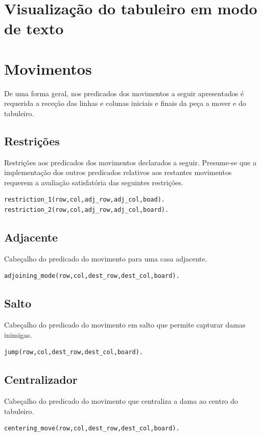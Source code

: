 \documentclass[a4paper,11pt]{article}
\begin{document}
\section{Visualização do tabuleiro em modo de texto}

\section{Movimentos}

De uma forma geral, nos predicados dos movimentos a seguir apresentados é requerida a receção das linhas e colunas iniciais e finais da peça a mover e do tabuleiro.
\subsection{Restrições}
Restrições aos predicados dos movimentos declarados a seguir. Presume-se que a implementação dos outros predicados relativos aos restantes movimentos requerem a avaliação satisfatória das seguintes restrições.
\begin{verbatim}
restriction_1(row,col,adj_row,adj_col,boad).
restriction_2(row,col,adj_row,adj_col,board).
\end{verbatim}

\subsection{Adjacente}
Cabeçalho do predicado do movimento para uma casa adjacente.
\begin{verbatim}
adjoining_mode(row,col,dest_row,dest_col,board).
\end{verbatim}

\subsection{Salto}
Cabeçalho do predicado do movimento em salto que permite capturar damas inimigas.
\begin{verbatim}
jump(row,col,dest_row,dest_col,board).
\end{verbatim}

\subsection{Centralizador}
Cabeçalho do predicado do movimento que centraliza a dama ao centro do tabuleiro.
\begin{verbatim}
centering_move(row,col,dest_row,dest_col,board).
\end{verbatim}
\end{document}

